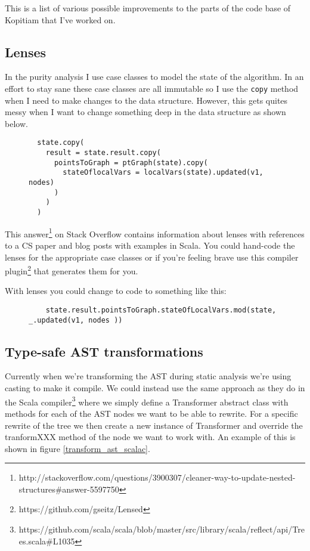 \documentclass[11pt]{exam}
\begin{document}
This is a list of various possible improvements to the parts of the code base of Kopitiam that I've worked on.

\subsection{Lenses}

In the purity analysis I use case classes to model the state of the algorithm. In an effort to stay sane these case classes are all immutable so I use the \texttt{copy} method when I need to make changes to the data structure. However, this gets quites messy when I want to change something deep in the data structure as shown below.

\begin{figure}[h!]
  \begin{lstlisting}
  state.copy(
    result = state.result.copy(
      pointsToGraph = ptGraph(state).copy(
        stateOflocalVars = localVars(state).updated(v1, nodes)
      )
    )
  )
  \end{lstlisting}
\end{figure}

This answer\footnote{http://stackoverflow.com/questions/3900307/cleaner-way-to-update-nested-structures\#answer-5597750} on Stack Overflow contains information about lenses with references to a CS paper and blog posts with examples in Scala. You could hand-code the lenses for the appropriate case classes or if you're feeling brave use this compiler plugin\footnote{https://github.com/gseitz/Lensed} that generates them for you. \newline

With lenses you could change to code to something like this:

\begin{figure}[h!]
  \begin{lstlisting}
    state.result.pointsToGraph.stateOfLocalVars.mod(state, _.updated(v1, nodes ))
  \end{lstlisting}
\end{figure}

\subsection{Type-safe AST transformations}

Currently when we're transforming the AST during static analysis we're using casting to make it compile. We could instead use the same approach as they do in the Scala compiler\footnote{https://github.com/scala/scala/blob/master/src/library/scala/reflect/api/Trees.scala\#L1035} where we simply define a Transformer abstract class with methods for each of the AST nodes we want to be able to rewrite. For a specific rewrite of the tree we then create a new instance of Transformer and override the tranformXXX method of the node we want to work with. An example of this is shown in figure \ref{transform_ast_scalac}.
\end{document}
